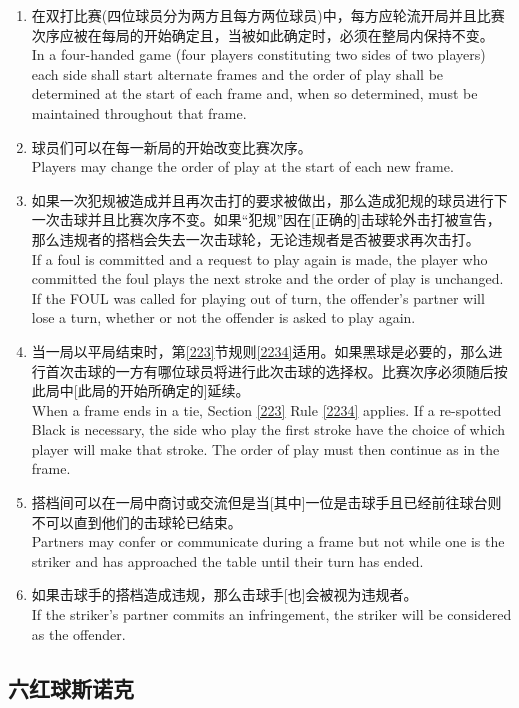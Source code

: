 \begin{enumerate}[label=(\alph*)]
    \item 在双打比赛(四位球员分为两方且每方两位球员)中，每方应轮流开局并且比赛次序应被在每局的开始确定且，当被如此确定时，必须在整局内保持不变。\\
    In a four-handed game (four players constituting two sides of two players) each side shall start alternate frames and the order of play shall be determined at the start of each frame and, when so determined, must be maintained throughout that frame.
    \item 球员们可以在每一新局的开始改变比赛次序。\\
    Players may change the order of play at the start of each new frame.
    \item 如果一次犯规被造成并且再次击打的要求被做出，那么造成犯规的球员进行下一次击球并且比赛次序不变。如果“犯规”因在[正确的]击球轮外击打被宣告，那么违规者的搭档会失去一次击球轮，无论违规者是否被要求再次击打。\\
    If a foul is committed and a request to play again is made, the player who committed the foul plays the next stroke and the order of play is unchanged. If the FOUL was called for playing out of turn, the offender's partner will lose a turn, whether or not the offender is asked to play again.
    \item 当一局以平局结束时，第\ref{223}节规则\ref{2234}适用。如果\respotted{}黑球是必要的，那么进行首次击球的一方有哪位球员将进行此次击球的选择权。比赛次序必须随后按此局中[此局的开始所确定的]延续。\\
    When a frame ends in a tie, Section \ref{223} Rule \ref{2234} applies. If a re-spotted Black is necessary, the side who play the first stroke have the choice of which player will make that stroke. The order of play must then continue as in the frame.
    \item \label{22318e}搭档间可以在一局中商讨或交流但是当[其中]一位是击球手且已经前往球台则不可以直到他们的击球轮已结束。\\
    Partners may confer or communicate during a frame but not while one is the striker and has approached the table until their turn has ended. 
    \item 如果击球手的搭档造成违规，那么击球手[也]会被视为违规者。\\
    If the striker's partner commits an infringement, the striker will be considered as the offender.
\end{enumerate}

\subsection{六红球斯诺克}

